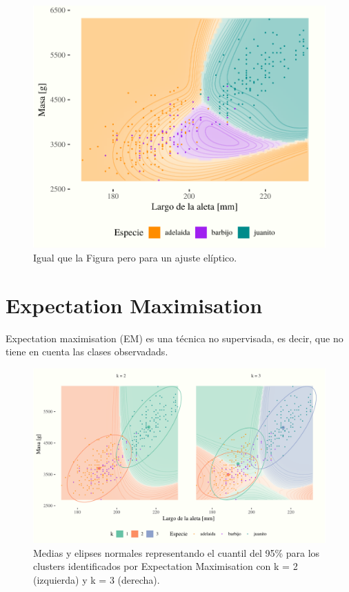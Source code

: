 \documentclass[]{tufte-handout}
\begin{document}
\begin{figure}
\includegraphics{TP-Labo-2_files/figure-latex/logistica-eliptica-2} \caption[Igual que la Figura  pero para un ajuste elíptico]{Igual que la Figura  pero para un ajuste elíptico.}\label{fig:logistica-eliptica}
\end{figure}

\hypertarget{expectation-maximisation}{%
\section{Expectation Maximisation}\label{expectation-maximisation}}

Expectation maximisation (EM) es una técnica no supervisada, es decir, que no tiene en cuenta las clases observadads.

\begin{figure}
\includegraphics{TP-Labo-2_files/figure-latex/em-pinguinos-2} \caption[Medias y elipses normales representando el cuantil del 95\% para los clusters identificados por Expectation Maximisation con k = 2 (izquierda) y k = 3 (derecha)]{Medias y elipses normales representando el cuantil del 95\% para los clusters identificados por Expectation Maximisation con k = 2 (izquierda) y k = 3 (derecha).}\label{fig:em-pinguinos}
\end{figure}
\end{document}
